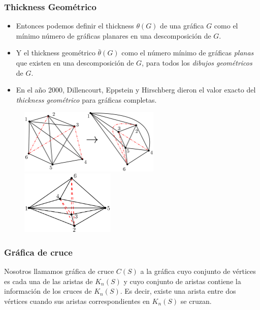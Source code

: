 \begin{frame}\frametitle{Thickness Geométrico}
	\begin{itemize}
		\item[] Entonces podemos definir el thickness $\theta(G)$ de una gráfica $G$ como el mínimo número de gráficas planares en una descomposición de $G$. 
		
		\item[] Y el thickness geométrico $\bar{\theta}(G)$ como el número mínimo de gráficas \emph{planas} que existen en una descomposición de $G$, para todos los \emph{dibujos geométricos} de $G$.
		
		\item[] En el año 2000, Dillencourt, Eppstein y Hirschberg dieron el valor exacto del \emph{thickness geométrico} para gráficas completas.\\[5pt]
	\end{itemize}
	
\end{frame}
\begin{frame}
	\begin{figure}
		\centering
		\includegraphics[width=0.6\textwidth]{images/K6_thicknes2}%
		~\vrule
		\includegraphics[width=0.4\textwidth]{images/K6_gthicknes2}
	\end{figure}
\end{frame}

\begin{frame}\frametitle{Gráfica de cruce}
Nosotros llamamos gráfica de cruce $C(S)$ a la gráfica cuyo conjunto de vértices es cada una de las aristas de $K_n(S)$ y cuyo conjunto de aristas contiene la información de los cruces de $K_n(S)$. Es decir, existe una arista entre dos vértices cuando sus aristas correspondientes en $K_n(S)$ se cruzan.
\end{frame}

